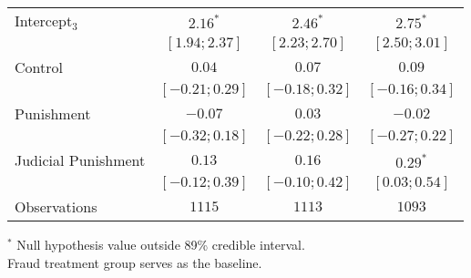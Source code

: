 \begin{table}[h]
\begin{center}
\begin{threeparttable}
\begin{tabular}{l c c c}
Intercept$_3$       & $2.16^{*}$        & $2.46^{*}$        & $2.75^{*}$        \\
                    & $ [ 1.94;  2.37]$ & $ [ 2.23;  2.70]$ & $ [ 2.50;  3.01]$ \\
Control             & $0.04$            & $0.07$            & $0.09$            \\
                    & $ [-0.21;  0.29]$ & $ [-0.18;  0.32]$ & $ [-0.16;  0.34]$ \\
Punishment          & $-0.07$           & $0.03$            & $-0.02$           \\
                    & $ [-0.32;  0.18]$ & $ [-0.22;  0.28]$ & $ [-0.27;  0.22]$ \\
Judicial Punishment & $0.13$            & $0.16$            & $0.29^{*}$        \\
                    & $ [-0.12;  0.39]$ & $ [-0.10;  0.42]$ & $ [ 0.03;  0.54]$ \\
\hline
Observations        & $1115$            & $1113$            & $1093$            \\
\hline
\end{tabular}
\begin{tablenotes}[flushleft]
\scriptsize{$^*$ Null hypothesis value outside 89\% credible interval.  \\
Fraud treatment group serves as the baseline.}
\end{tablenotes}
\end{threeparttable}
\label{table:ol_main_ru_npol_1201}
\end{center}
\end{table}
